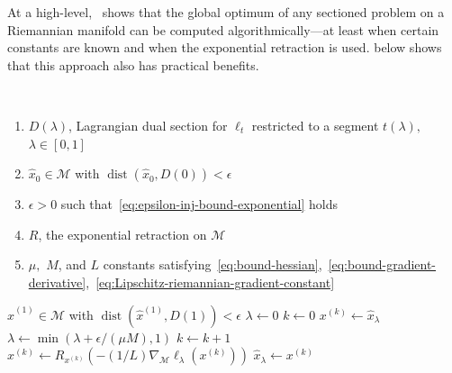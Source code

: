 \documentclass{article}
\numberwithin{equation}{section}
\newcommand{\cM}{{\mathcal{M}}}
\begin{document}
At a high-level,~ shows that the global optimum of any sectioned problem on a Riemannian manifold can be computed algorithmically---at least when certain constants are known and when the exponential retraction is used.
 below shows that this approach also has practical benefits.

\begin{algorithm}
\caption{Continuous Homotopy Optimization with Riemannian Descent }\label{alg:chord}
\begin{algorithmic}
\Require \\
\begin{enumerate}
\item $D(\lambda )$, Lagrangian dual section for $\ell_t$ restricted to a segment $t(\lambda ),$ $\lambda \in [0,1]$
\item $\hat{x}_0\in \cM$ with $\operatorname{dist} (\hat{x}_0, D(0)) < \epsilon $
\item $\epsilon >0$ such that~\eqref{eq:epsilon-inj-bound-exponential} holds
\item $R$, the exponential retraction on $\cM$ 
\item $\mu ,$ $M$, and $L$ constants satisfying~\eqref{eq:bound-hessian},~\eqref{eq:bound-gradient-derivative},~\eqref{eq:Lipschitz-riemannian-gradient-constant}
\end{enumerate}
\Ensure $\hat{x}^{(1)}\in \cM$ with $\operatorname{dist} (\hat{x}^{(1)}, D(1)) < \epsilon $
 \State $\lambda \gets 0$
\State $k\gets 0$
\State $x^{(k)} \gets \hat{x}_{\lambda }$
\State $\lambda \gets \min ( \lambda + \epsilon / (\mu M), 1)$
\State $k\gets k+1$
\State $x^{(k)} \gets R_{x^{(k)}} ( - (1/L) \nabla_{\cM}\ell_\lambda (x^{(k)}) ) $
\EndWhile
\State $\hat{x}_\lambda \gets x^{(k)}$
\EndWhile
\end{algorithmic}
\end{algorithm}
\end{document}
